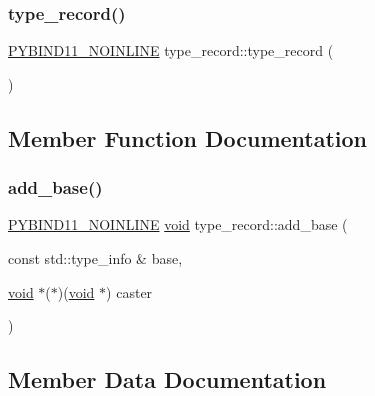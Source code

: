 \subsubsection{\texorpdfstring{type\_record()}{type\_record()}}
{\footnotesize\ttfamily \mbox{\hyperlink{detail_2common_8h_a1fb186b7494d5c576d902c0730ecbb71}{P\+Y\+B\+I\+N\+D11\+\_\+\+N\+O\+I\+N\+L\+I\+NE}} type\+\_\+record\+::type\+\_\+record (\begin{DoxyParamCaption}{ }\end{DoxyParamCaption})\hspace{0.3cm}{\ttfamily [inline]}}



\subsection{Member Function Documentation}
\mbox{\label{structtype__record_ae2bfc26eba5e9e9b6c7f6a22dcbff918}} 
\subsubsection{\texorpdfstring{add\_base()}{add\_base()}}
{\footnotesize\ttfamily \mbox{\hyperlink{detail_2common_8h_a1fb186b7494d5c576d902c0730ecbb71}{P\+Y\+B\+I\+N\+D11\+\_\+\+N\+O\+I\+N\+L\+I\+NE}} \mbox{\hyperlink{_s_d_l__opengles2__gl2ext_8h_ae5d8fa23ad07c48bb609509eae494c95}{void}} type\+\_\+record\+::add\+\_\+base (\begin{DoxyParamCaption}\item[{const std\+::type\+\_\+info \&}]{base,  }\item[{\mbox{\hyperlink{_s_d_l__opengles2__gl2ext_8h_ae5d8fa23ad07c48bb609509eae494c95}{void}} $\ast$($\ast$)(\mbox{\hyperlink{_s_d_l__opengles2__gl2ext_8h_ae5d8fa23ad07c48bb609509eae494c95}{void}} $\ast$)}]{caster }\end{DoxyParamCaption})\hspace{0.3cm}{\ttfamily [inline]}}



\subsection{Member Data Documentation}
\mbox{\label{structtype__record_ae84dc75887eb2af0bd2b3d1bcfe5496c}} 

